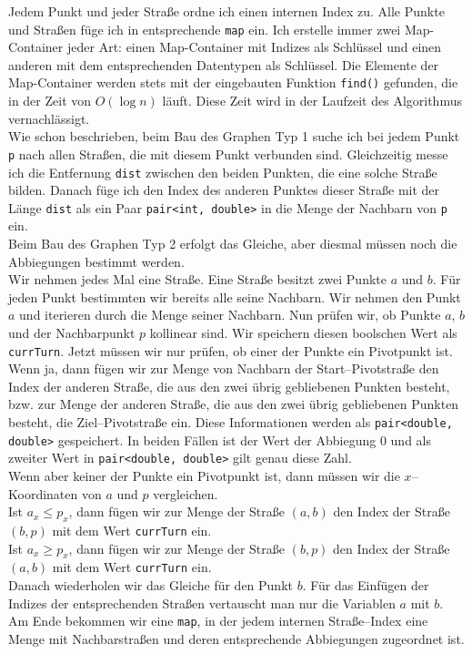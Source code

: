 \documentclass[a4paper,10pt,ngerman]{scrartcl}
\begin{document}
Jedem Punkt und jeder Straße ordne ich einen internen Index zu. Alle Punkte und Straßen füge ich in entsprechende
\texttt{map} ein. Ich erstelle immer zwei Map-Container jeder Art: einen Map-Container mit Indizes als Schlüssel
und einen anderen mit dem entsprechenden Datentypen als Schlüssel. Die Elemente der Map-Container werden stets mit
der eingebauten Funktion \texttt{find()} gefunden, die in der Zeit von $O(\log n)$ läuft. Diese Zeit wird
in der Laufzeit des Algorithmus vernachlässigt.\\
Wie schon beschrieben, beim Bau des Graphen Typ 1 suche ich bei jedem Punkt \texttt{p} nach allen Straßen, die 
mit diesem Punkt verbunden sind. Gleichzeitig messe ich die Entfernung \texttt{dist} zwischen den beiden Punkten,
die eine solche Straße bilden. Danach füge ich den Index des anderen Punktes dieser Straße mit der Länge \texttt{dist} als ein Paar
\texttt{pair<int, double>} in die Menge der Nachbarn von \texttt{p} ein.\\
Beim Bau des Graphen Typ 2 erfolgt das Gleiche, aber diesmal müssen noch die Abbiegungen bestimmt werden.\\
Wir nehmen jedes Mal eine Straße. Eine Straße besitzt zwei Punkte $a$ und $b$. 
Für jeden Punkt bestimmten wir bereits alle seine Nachbarn. 
Wir nehmen den Punkt $a$ und iterieren durch die Menge seiner Nachbarn. 
Nun prüfen wir, ob Punkte $a$, $b$ und der Nachbarpunkt $p$ kollinear sind.
Wir speichern diesen boolschen Wert als \texttt{currTurn}. 
Jetzt müssen wir nur prüfen, ob einer der Punkte ein Pivotpunkt ist.
Wenn ja, dann fügen wir zur Menge von Nachbarn der Start--Pivotstraße
den Index der anderen Straße, die aus den zwei übrig gebliebenen Punkten besteht, 
bzw. zur Menge der anderen Straße, die aus den zwei übrig gebliebenen Punkten besteht, die Ziel--Pivotstraße ein.
Diese Informationen werden als \texttt{pair<double, double>} gespeichert.
In beiden Fällen ist der Wert der Abbiegung 0 und als zweiter Wert in \texttt{pair<double, double>} gilt genau diese Zahl.\\
Wenn aber keiner der Punkte ein Pivotpunkt ist, dann müssen wir die $x$--Koordinaten von $a$ und $p$ vergleichen.\\
Ist $a_x \leq p_x$, dann fügen wir zur Menge der Straße $(a,b)$ den Index der Straße $(b, p)$
mit dem Wert \texttt{currTurn} ein.\\
Ist $a_x \geq p_x$, dann fügen wir zur Menge der Straße $(b,p)$ den Index der Straße $(a, b)$
mit dem Wert \texttt{currTurn} ein.\\
Danach wiederholen wir das Gleiche für den Punkt $b$. Für das Einfügen der Indizes der entsprechenden Straßen
vertauscht man nur die Variablen $a$ mit $b$.\\
Am Ende bekommen wir eine \texttt{map},
in der jedem internen Straße–Index eine Menge mit Nachbarstraßen und deren entsprechende
Abbiegungen zugeordnet ist.\\
\end{document}
